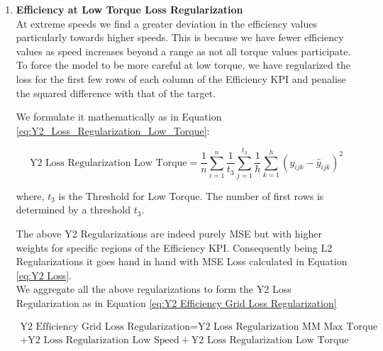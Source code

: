 \documentclass{report} %
\begin{document}
\begin{enumerate}
\begin{enumerate}
\item \textbf{Efficiency at Low Torque Loss Regularization} \\

At extreme speeds we find a greater deviation in the efficiency values particularly towards higher speeds. This is because we have fewer efficiency values as speed increases beyond a range as not all torque values participate.
To force the model to be more careful at low torque, we have regularized the loss for the first few rows of each column of the Efficiency \ac{KPI} and penalise the squared difference with that of the target.

We formulate it mathematically as in Equation \ref{eq:Y2_Loss_Regularization_Low_Torque}:

\begin{equation}
    \text{Y2 Loss Regularization Low Torque} = \frac{1}{n} \sum_{i=1}^{n} \frac{1}{t_{3}} \sum_{j=1}^{t_{3}} \frac{1}{h} \sum_{k=1}^{h} (y_{ijk} - \hat{y}_{ijk})^2
    \label{eq:Y2_Loss_Regularization_Low_Torque}
\end{equation}

where, \(t_{3}\) is the Threshold for Low Torque.
The number of first rows is determined by a threshold $t_{3}$.

The above Y2 Regularizations are indeed purely \ac{MSE} but with higher weights for specific regions of the Efficiency \ac{KPI}.
Consequently being L2 Regularizations it goes hand in hand with \ac{MSE} Loss calculated in Equation \ref{eq:Y2 Loss}.\\

We aggregate all the above regularizations to form the Y2 Loss Regularization as in Equation \ref{eq:Y2 Efficiency Grid Loss Regularization}

\begin{equation}
    \begin{split}
\text{Y2 Efficiency Grid Loss Regularization} = \text{Y2 Loss Regularization MM Max Torque} \\
    + \text{Y2 Loss Regularization Low Speed} + \text{Y2 Loss Regularization Low Torque}
    \end{split}
    \label{eq:Y2 Efficiency Grid Loss Regularization}
\end{equation}

\end{enumerate}

\vspace{0.2cm} %

\end{enumerate}
\end{document}
